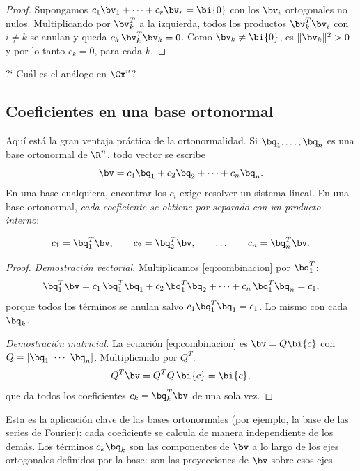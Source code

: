 \begin{proof}
Supongamos $c_1\bv_1+\cdots+c_r\bv_r=\bi{0}$ con los $\bv_i$ ortogonales no
nulos. Multiplicando por $\bv_k^T$ a la izquierda, todos los productos
$\bv_k^T\bv_i$ con $i\ne k$ se anulan y queda
$c_k\,\bv_k^T\bv_k=0$. Como $\bv_k\ne\bi{0}$, es $\|\bv_k\|^2>0$ y por
lo tanto $c_k=0$, para cada $k$.
\end{proof}

?` Cu\'al es el an\'alogo en $\Cx^n$?

\subsection*{Coeficientes en una base ortonormal}

Aquí está la gran ventaja práctica de la ortonormalidad. Si
$\bq_1,\dots,\bq_n$ es una base ortonormal de $\R^n$, todo vector se escribe
\begin{equation}\label{eq:combinacion}
\bv=c_1\bq_1+c_2\bq_2+\cdots+c_n\bq_n .
\end{equation}
En una base cualquiera, encontrar los $c_i$ exige resolver un sistema lineal.
En una base ortonormal, \emph{cada coeficiente se obtiene por separado con un
producto interno}:

\begin{teorema}\label{teo:coeficientes}
\[
c_1=\bq_1^T\bv,\qquad c_2=\bq_2^T\bv,\qquad\dots\qquad
c_n=\bq_n^T\bv .
\]
\end{teorema}

\begin{proof}
\emph{Demostración vectorial.} Multiplicamos \eqref{eq:combinacion} por
$\bq_1^T$:
\[
\bq_1^T\bv=c_1\,\bq_1^T\bq_1+c_2\,\bq_1^T\bq_2+\cdots
+c_n\,\bq_1^T\bq_n=c_1 ,
\]
porque todos los términos se anulan salvo $c_1\bq_1^T\bq_1=c_1$. Lo
mismo con cada $\bq_k$.

\emph{Demostración matricial.} La ecuación \eqref{eq:combinacion} es
$\bv=Q\bi{c}$ con $Q=[\bq_1\ \cdots\ \bq_n]$. Multiplicando por $Q^T$:
\[
Q^T\bv=Q^T Q\,\bi{c}=\bi{c},
\]
que da todos los coeficientes $c_k=\bq_k^T\bv$ de una sola vez.
\end{proof}

\begin{observacion}
Esta es la aplicación clave de las bases ortonormales (por ejemplo, la base
de las series de Fourier): cada coeficiente se calcula de manera
independiente de los demás. Los términos $c_k\bq_k$ son las componentes de
$\bv$ a lo largo de los ejes ortogonales definidos por la base: son las
proyecciones de $\bv$ sobre esos ejes.
\end{observacion}

